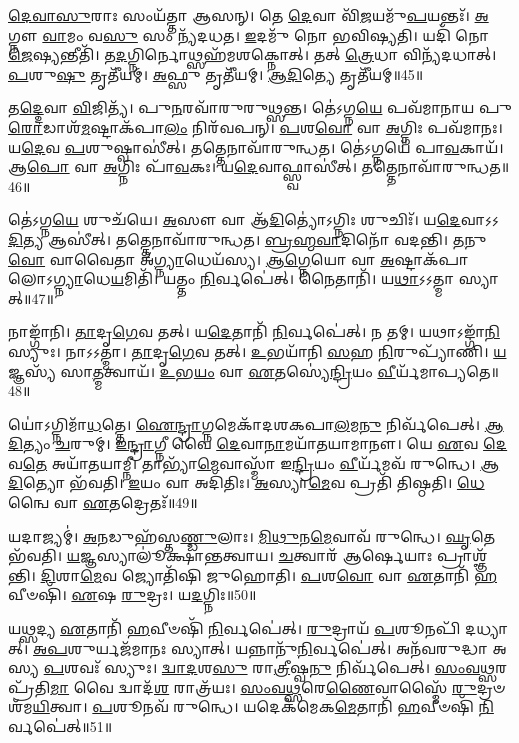 \-\ul{𑌦𑍇}\-\-\ul{𑌵𑌾}\-\-\ul{𑌸𑍁}\-𑌰𑌾𑌃 𑌸𑌂𑌯᳴𑌤𑍍𑌤𑌾 𑌆𑌸𑌨𑍍।
𑌤𑍇 \ul{𑌦𑍇}\-𑌵𑌾 𑌵𑌿᳴\-\ul{𑌜}\-𑌯𑌮𑍁᳴\-\ul{𑌪}\-𑌯𑌨𑍍𑌤𑌃᳴।
\-\ul{𑌅}\-𑌗𑍍𑌨𑍗 \ul{𑌵𑌾}\-𑌮𑌂 𑌵\-\ul{𑌸𑍁} 𑌸𑌂 𑌨𑍍𑌯᳴𑌦𑌧𑌤।
\-\ul{𑌇}\-𑌦𑌮𑍁᳴ 𑌨𑍋 𑌭𑌵𑌿𑌷𑍍𑌯𑌤𑌿।
𑌯𑌦𑌿᳴ 𑌨𑍋 \ul{𑌜𑍇}\-𑌷𑍍𑌯𑌨𑍍𑌤𑍀𑌤𑌿᳴।
𑌤\-\ul{𑌦}\-𑌗𑍍𑌨𑌿𑌰𑍍𑌨𑍋𑌥𑍍𑌸𑌹᳴𑌮𑌶𑌕𑍍𑌨𑍋𑌤𑍍।
𑌤𑌤𑍍 \ul{𑌤𑍍𑌰𑍇}\-𑌧𑌾 𑌵𑌿𑌨𑍍𑌯᳴𑌦𑌧𑌾𑌤𑍍।
\-\ul{𑌪}\-𑌶𑍁\-\ul{𑌷𑍁} 𑌤𑍃𑌤𑍀᳴𑌯𑌮𑍍।
\-\ul{𑌅}\-𑌫𑍍𑌸𑍁 𑌤𑍃𑌤𑍀᳴𑌯𑌮𑍍।
\-\ul{𑌆}\-\-\ul{𑌦𑌿}\-𑌤𑍍𑌯𑍇 𑌤𑍃𑌤𑍀᳴𑌯𑌮𑍍॥45॥

𑌤\-\ul{𑌦𑍍𑌦𑍇}\-𑌵𑌾 \ul{𑌵𑌿}\-𑌜𑌿𑌤𑍍𑌯᳴।
𑌪𑍁\-\ul{𑌨}\-𑌰𑌵𑌾᳴𑌰𑍁𑌰𑍁𑌥𑍍𑌸𑌨𑍍𑌤।
𑌤𑍇॑𑌽𑌗𑍍𑌨\-\ul{𑌯𑍇} 𑌪𑌵᳴𑌮𑌾𑌨𑌾𑌯 𑌪𑍁\-\ul{𑌰𑍋}\-𑌡𑌾𑌶᳴\-\ul{𑌮}\-𑌷𑍍𑌟𑌾\-𑌕᳴𑌪𑌾\-\ul{𑌲𑌂} 𑌨𑌿𑌰᳴𑌵𑌪𑌨𑍍।
\-\ul{𑌪}\-𑌶\-\ul{𑌵𑍋} 𑌵𑌾 \ul{𑌅}\-𑌗𑍍𑌨𑌿𑌃 𑌪𑌵᳴𑌮𑌾𑌨𑌃।
𑌯\-\ul{𑌦𑍇}\-𑌵 \ul{𑌪}\-𑌶𑍁𑌷𑍍𑌵𑌾𑌸𑍀॑𑌤𑍍।
𑌤𑌤𑍍𑌤𑍇𑌨𑌾𑌵𑌾᳴𑌰𑍁𑌨𑍍𑌧𑌤।
𑌤𑍇॑𑌽𑌗𑍍𑌨𑌯𑍇᳴ 𑌪𑌾\-\ul{𑌵}\-𑌕𑌾𑌯᳴।
𑌆\-\ul{𑌪𑍋} 𑌵𑌾 \ul{𑌅}\-𑌗𑍍𑌨𑌿𑌃 𑌪𑌾᳴\-\ul{𑌵}\-𑌕𑌃।
𑌯\-\ul{𑌦𑍇}\-𑌵𑌾𑌫𑍍𑌸𑍍𑌵𑌾𑌸𑍀॑𑌤𑍍।
𑌤𑌤𑍍𑌤𑍇𑌨𑌾𑌵𑌾᳴𑌰𑍁𑌨𑍍𑌧𑌤॥46॥

𑌤𑍇॑𑌽𑌗𑍍𑌨\-\ul{𑌯𑍇} 𑌶𑍁𑌚᳴𑌯𑍇।
\-\ul{𑌅}\-𑌸𑍗 𑌵𑌾 𑌆᳴\-\ul{𑌦𑌿}\-𑌤𑍍𑌯𑍋॑\-𑌽𑌗𑍍𑌨𑌿𑌃 𑌶𑍁𑌚𑌿𑌃᳴।
𑌯\-\ul{𑌦𑍇}\-𑌵𑌾𑌽𑌽\-\ul{𑌦𑌿}\-𑌤𑍍𑌯 𑌆𑌸𑍀॑𑌤𑍍।
𑌤𑌤𑍍𑌤𑍇𑌨𑌾𑌵𑌾᳴𑌰𑍁𑌨𑍍𑌧𑌤।
\-\ul{𑌬𑍍𑌰}\-\-\ul{𑌹𑍍𑌮}\-\-\ul{𑌵𑌾}\-𑌦𑌿𑌨𑍋᳴ 𑌵𑌦𑌨𑍍𑌤𑌿।
\-\ul{𑌤}\-𑌨𑍁\-\ul{𑌵𑍋} 𑌵𑌾𑌵𑍈𑌤𑌾 𑌅᳴\-\ul{𑌗𑍍𑌨𑍍𑌯𑌾}\-𑌧𑍇𑌯᳴𑌸𑍍𑌯।
\-\ul{𑌆}\-\-\ul{𑌗𑍍𑌨𑍇}\-𑌯𑍋 𑌵𑌾 \ul{𑌅}\-𑌷𑍍𑌟𑌾\-𑌕᳴𑌪𑌾𑌲𑍋\-𑌽\-\ul{𑌗𑍍𑌨𑍍𑌯𑌾}\-𑌧𑍇\-\ul{𑌯}\-𑌮𑌿𑌤𑌿᳴।
𑌯𑌤𑍍𑌤𑌂 \ul{𑌨𑌿}\-𑌰𑍍𑌵𑌪𑍇॑𑌤𑍍।
𑌨𑍈𑌤𑌾𑌨𑌿᳴।
𑌯\-\ul{𑌥𑌾}\-𑌽𑌽𑌤𑍍𑌮𑌾 𑌸𑍍𑌯𑌾𑌤𑍍॥47॥

𑌨𑌾𑌙𑍍𑌗𑌾᳴𑌨𑌿।
\-\ul{𑌤𑌾}\-𑌦𑍃\-\ul{𑌗𑍇}\-𑌵 𑌤𑌤𑍍।
𑌯\-\ul{𑌦𑍇}\-𑌤𑌾𑌨𑌿᳴ \ul{𑌨𑌿}\-𑌰𑍍𑌵𑌪𑍇॑𑌤𑍍।
𑌨 𑌤𑌮𑍍।
𑌯𑌥𑌾𑌽𑌙𑍍𑌗𑌾᳴\-\ul{𑌨𑌿} 𑌸𑍍𑌯𑍁𑌃।
𑌨𑌾𑌽𑌽𑌤𑍍𑌮𑌾।
\-\ul{𑌤𑌾}\-𑌦𑍃\-\ul{𑌗𑍇}\-𑌵 𑌤𑌤𑍍।
\-\ul{𑌉}\-𑌭𑌯𑌾᳴𑌨𑌿 \ul{𑌸}\-𑌹 \ul{𑌨𑌿}\-𑌰𑍁𑌪𑍍𑌯𑌾᳴𑌣𑌿।
\-\ul{𑌯}\-𑌜𑍍𑌞𑌸𑍍𑌯᳴ 𑌸𑌾\-\ul{𑌤𑍍𑌮}\-𑌤𑍍𑌵𑌾𑌯᳴।
\-\ul{𑌉}\-𑌭\-\ul{𑌯𑌂} 𑌵𑌾 \ul{𑌏}\-𑌤𑌸𑍍𑌯𑍇॑\-\ul{𑌨𑍍𑌦𑍍𑌰𑌿}\-𑌯𑌂 \ul{𑌵𑍀}\-𑌰𑍍𑌯᳴𑌮𑌾𑌪𑍍𑌯𑌤𑍇॥48॥

𑌯𑍋॑𑌽𑌗𑍍𑌨𑌿𑌮𑌾᳴\-\ul{𑌧}\-𑌤𑍍𑌤𑍇।
\-\ul{𑌐}\-\-\ul{𑌨𑍍𑌦𑍍𑌰𑌾}\-𑌗𑍍𑌨𑌮𑍇𑌕𑌾᳴\-𑌦𑌶\-𑌕𑌪𑌾\-\ul{𑌲}\-𑌮\-\ul{𑌨𑍁} 𑌨𑌿𑌰𑍍𑌵᳴𑌪𑍇𑌤𑍍।
\-\ul{𑌆}\-\-\ul{𑌦𑌿}\-𑌤𑍍𑌯𑌂 \ul{𑌚}\-𑌰𑍁𑌮𑍍।
\-\ul{𑌇}\-\-\ul{𑌨𑍍𑌦𑍍𑌰𑌾}\-𑌗𑍍𑌨𑍀 𑌵𑍈 \ul{𑌦𑍇}\-𑌵𑌾\-\ul{𑌨𑌾}\-𑌮𑌯𑌾᳴𑌤𑌯𑌾𑌮𑌾𑌨𑍗।
𑌯𑍇 \ul{𑌏}\-𑌵 \ul{𑌦𑍇}\-𑌵\-\ul{𑌤𑍇} 𑌅𑌯𑌾᳴𑌤𑌯𑌾𑌮𑍍𑌨𑍀।
𑌤𑌾𑌭𑍍𑌯𑌾᳴\-\ul{𑌮𑍇}\-𑌵𑌾𑌸𑍍𑌮𑌾᳴ 𑌇\-\ul{𑌨𑍍𑌦𑍍𑌰𑌿}\-𑌯𑌂 \ul{𑌵𑍀}\-𑌰𑍍𑌯᳴𑌮𑌵᳴ 𑌰𑍁𑌨𑍍𑌧𑍇।
\-\ul{𑌆}\-\-\ul{𑌦𑌿}\-𑌤𑍍𑌯𑍋 𑌭᳴𑌵𑌤𑌿।
\-\ul{𑌇}\-𑌯𑌂 𑌵𑌾 𑌅𑌦𑌿᳴𑌤𑌿𑌃।
\-\ul{𑌅}\-𑌸𑍍𑌯𑌾\-\ul{𑌮𑍇}\-𑌵 𑌪𑍍𑌰𑌤𑌿᳴ 𑌤𑌿𑌷𑍍𑌠𑌤𑌿।
\-\ul{𑌧𑍇}\-𑌨𑍍𑌵𑍈 𑌵𑌾 \ul{𑌏}\-𑌤𑌦𑍍𑌰𑍇𑌤𑌃᳴॥49॥

𑌯𑌦𑌾𑌜𑍍𑌯𑌮𑍍॑।
\-\ul{𑌅}\-\-\ul{𑌨}\-𑌡𑍁𑌹᳴𑌸𑍍𑌤\-\ul{𑌣𑍍𑌡𑍁}\-𑌲𑌾𑌃।
\-\ul{𑌮𑌿}\-\-\ul{𑌥𑍁}\-𑌨\-\ul{𑌮𑍇}\-𑌵𑌾𑌵᳴ 𑌰𑍁𑌨𑍍𑌧𑍇।
\-\ul{𑌘𑍃}\-𑌤𑍇 𑌭᳴𑌵𑌤𑌿।
\-\ul{𑌯}\-𑌜𑍍𑌞𑌸𑍍𑌯𑌾𑌲𑍂॑𑌕𑍍𑌷𑌾𑌨𑍍𑌤𑌤𑍍𑌵𑌾𑌯।
\-\ul{𑌚}\-𑌤𑍍𑌵𑌾𑌰᳴ 𑌆𑌰𑍍\mbox{}\-\ul{𑌷𑍇}\-𑌯𑌾𑌃 𑌪𑍍𑌰𑌾𑌶𑍍𑌞᳴𑌨𑍍𑌤𑌿।
\-\ul{𑌦𑌿}\-𑌶𑌾\-\ul{𑌮𑍇}\-𑌵 𑌜𑍍𑌯𑍋𑌤𑌿᳴𑌷𑌿 𑌜𑍁𑌹𑍋𑌤𑌿।
\-\ul{𑌪}\-𑌶\-\ul{𑌵𑍋} 𑌵𑌾 \ul{𑌏}\-𑌤𑌾𑌨𑌿᳴ \ul{𑌹}\-𑌵𑍀𑍞𑌷𑌿᳴।
\-\ul{𑌏}\-𑌷 \ul{𑌰𑍁}\-𑌦𑍍𑌰𑌃।
𑌯\-\ul{𑌦}\-𑌗𑍍𑌨𑌿𑌃॥50॥

𑌯\-\ul{𑌥𑍍𑌸}\-𑌦𑍍𑌯 \ul{𑌏}\-𑌤𑌾𑌨𑌿᳴ \ul{𑌹}\-𑌵𑍀𑍞𑌷𑌿᳴ \ul{𑌨𑌿}\-𑌰𑍍𑌵𑌪𑍇॑𑌤𑍍।
\-\ul{𑌰𑍁}\-𑌦𑍍𑌰𑌾𑌯᳴ \ul{𑌪}\-𑌶𑍂𑌨𑌪𑌿᳴ 𑌦𑌧𑍍𑌯𑌾𑌤𑍍।
\-\ul{𑌅}\-\-\ul{𑌪}\-𑌶𑍁𑌰𑍍𑌯𑌜᳴𑌮𑌾𑌨𑌃 𑌸𑍍𑌯𑌾𑌤𑍍।
𑌯𑌨𑍍𑌨𑌾𑌨𑍁᳴\-\ul{𑌨𑌿}\-𑌰𑍍𑌵𑌪𑍇॑𑌤𑍍।
𑌅𑌨᳴𑌵𑌰𑍁𑌦𑍍𑌧𑌾 𑌅𑌸𑍍𑌯 \ul{𑌪}\-𑌶𑌵𑌃᳴ 𑌸𑍍𑌯𑍁𑌃।
\-\ul{𑌦𑍍𑌵𑌾}\-\-\ul{𑌦}\-𑌶\-\ul{𑌸𑍁} 𑌰𑌾\-\ul{𑌤𑍍𑌰𑍀}\-𑌷𑍍𑌵\-\ul{𑌨𑍁} 𑌨𑌿𑌰𑍍𑌵᳴𑌪𑍇𑌤𑍍।
\-\ul{𑌸𑌂}\-\-\ul{𑌵}\-\-\ul{𑌥𑍍𑌸}\-𑌰𑌪𑍍𑌰᳴𑌤𑌿\-\ul{𑌮𑌾} 𑌵𑍈 𑌦𑍍𑌵𑌾𑌦᳴\-\ul{𑌶} 𑌰𑌾𑌤𑍍𑌰᳴𑌯𑌃।
\-\ul{𑌸𑌂}\-\-\ul{𑌵}\-\-\ul{𑌥𑍍𑌸}\-𑌰𑍇\-\ul{𑌣𑍈}\-𑌵𑌾𑌸𑍍𑌮𑍈᳴ \ul{𑌰𑍁}\-𑌦𑍍𑌰𑍞 𑌶᳴𑌮\-\ul{𑌯𑌿}\-𑌤𑍍𑌵𑌾।
\-\ul{𑌪}\-𑌶𑍂𑌨𑌵᳴ 𑌰𑍁𑌨𑍍𑌧𑍇।
𑌯𑌦𑍇𑌕᳴𑌮𑍇𑌕\-\ul{𑌮𑍇}\-𑌤𑌾𑌨𑌿᳴ \ul{𑌹}\-𑌵𑍀𑍞𑌷𑌿᳴ \ul{𑌨𑌿}\-𑌰𑍍𑌵𑌪𑍇॑𑌤𑍍॥51॥

